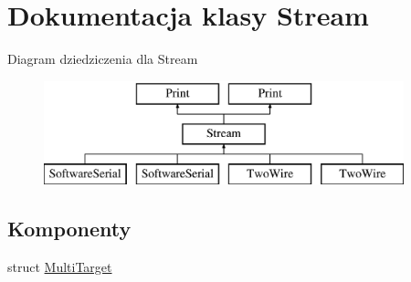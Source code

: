 \hypertarget{class_stream}{}\section{Dokumentacja klasy Stream}
\label{class_stream}
Diagram dziedziczenia dla Stream\begin{figure}[H]
\begin{center}
\leavevmode
\includegraphics[height=3.000000cm]{class_stream}
\end{center}
\end{figure}
\subsection*{Komponenty}
\begin{DoxyCompactItemize}
\item 
struct \hyperlink{struct_stream_1_1_multi_target}{Multi\+Target}
\end{DoxyCompactItemize}
